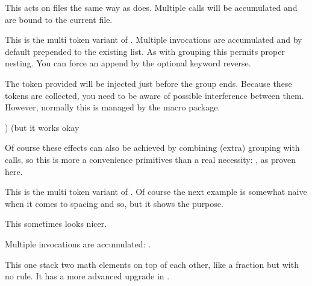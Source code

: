 \typebuffer

This acts on files the same way as  does. Multiple calls will
be accumulated and are bound to the current file.

\stopnewprimitive

\startnewprimitive[title={\prm {atendoffiled}}]

This is the multi token variant of . Multiple invocations are
accumulated and by default prepended to the existing list. As with grouping this
permits proper nesting. You can force an append by the optional keyword {reverse}.

\stopnewprimitive

\startnewprimitive[title={\prm {atendofgroup}}]

The token provided will be injected just before the group ends. Because
these tokens are collected, you need to be aware of possible interference
between them. However, normally this is managed by the macro package.

\startbuffer
\bgroup
\atendofgroup\unskip
\atendofgroup )%
(but it works okay
\egroup
\stopbuffer

\typebuffer

Of course these effects can also be achieved by combining (extra) grouping with
 calls, so this is more a convenience primitives than a real
necessity: {\inlinebuffer}, as proven here.

\stopnewprimitive

\startnewprimitive[title={\prm {atendofgrouped}}]

This is the multi token variant of . Of course the next
example is somewhat naive when it comes to spacing and so, but it shows the
purpose.

\startbuffer
\bgroup
{}%
%
This sometimes looks nicer.
\egroup
\stopbuffer

\typebuffer

Multiple invocations are accumulated: {\inlinebuffer}.

\stopnewprimitive

\startoldprimitive[title={\prm {atop}}][obsolete=yes]

This one stack two math elements on top of each other, like a fraction but with
no rule. It has a more advanced upgrade in .

\stopoldprimitive

\startoldprimitive[title={\prm {atopwithdelims}}][obsolete=yes]

